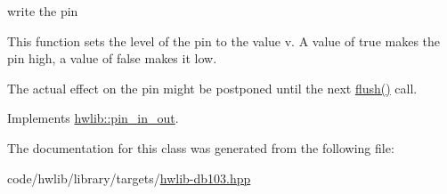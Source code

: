 write the pin

This function sets the level of the pin to the value v. A value of true makes the pin high, a value of false makes it low.

The actual effect on the pin might be postponed until the next \hyperlink{classdb103_1_1pin__in__out_a7cfd446e8a7c4453345ac3ec53d386ce}{flush()} call. 

Implements \hyperlink{classhwlib_1_1pin__in__out_aa5e2adcb5707f86c20b6306fc09f1582}{hwlib\+::pin\+\_\+in\+\_\+out}.



The documentation for this class was generated from the following file\+:\begin{DoxyCompactItemize}
\item 
code/hwlib/library/targets/\hyperlink{hwlib-db103_8hpp}{hwlib-\/db103.\+hpp}\end{DoxyCompactItemize}
